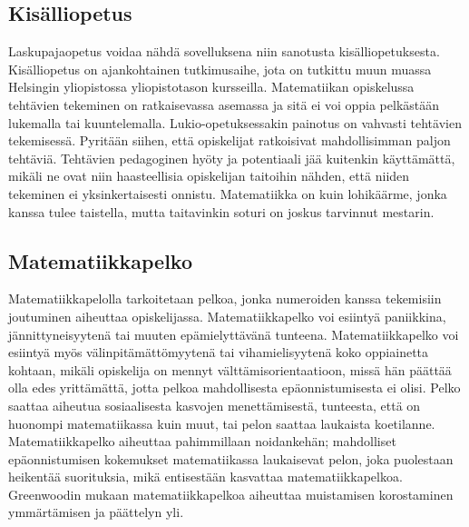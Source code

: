 \subsection{Kisälliopetus}
Laskupajaopetus voidaa nähdä sovelluksena niin sanotusta kisälliopetuk\-sesta. Kisälliopetus on ajankohtainen tutkimusaihe, jota on tutkittu muun muassa Helsingin yliopistossa yliopistotason kursseilla. Matematiikan opiske\-lussa tehtävien tekeminen on ratkaisevassa asemassa ja sitä ei voi oppia pelkästään lukemalla tai kuuntelemalla. Lukio-opetuksessakin painotus on vahvasti tehtävien tekemisessä. Pyritään siihen, että opiskelijat ratkoisivat mahdollisimman paljon tehtäviä. Tehtävien pedagoginen hyöty ja potentiaali jää kuitenkin käyttämättä, mikäli ne ovat niin haasteellisia opiskelijan taitoihin nähden, että niiden tekeminen ei yksinkertaisesti onnistu. Mate\-ma\-tiikka on kuin lohikäärme, jonka kanssa tulee taistella, mutta taitavinkin soturi on joskus tarvinnut mestarin.
\subsection{Matematiikkapelko}
Matematiikkapelolla tarkoitetaan pelkoa, jonka numeroiden kanssa tekemisiin joutuminen aiheuttaa opiskelijassa.
Matematiikkapelko voi esiintyä paniikkina, jännittyneisyytenä tai muuten epämielyttävänä tunteena. Matematiikkapelko voi esiintyä myös välinpitämättömyytenä tai vihamielisyytenä koko oppiainetta kohtaan, mikäli opiskelija on mennyt välttämisorientaatioon, missä hän päättää olla edes yrittämättä, jotta pelkoa mahdollisesta epäonnistumisesta ei olisi.
Pelko saattaa aiheutua sosiaalisesta kasvojen menettämisestä, tunteesta, että on huonompi matematiikassa kuin muut, tai pelon saattaa laukaista koetilanne.\cite{makkonen}\cite{mathanx} Matematiikkapelko aiheuttaa pahimmillaan noidankehän; mahdolliset epäonnistumisen kokemukset matematiikassa laukaisevat pelon, joka puolestaan heikentää suorituksia, mikä entisestään kasvattaa matematiikkapelkoa.
Greenwoodin mukaan matematiikkapelkoa aiheuttaa muistamisen korostaminen ymmärtämisen ja päättelyn yli.\cite{greenwood}

